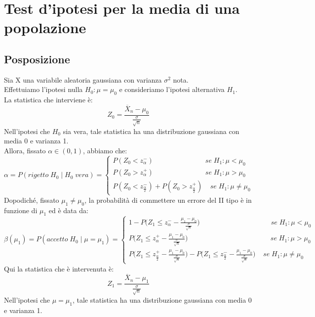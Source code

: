 \documentclass{article}
\begin{document}
\section*{Test d'ipotesi per la media di una popolazione}
\subsection*{Posposizione}
Sia X una variabile aleatoria gaussiana con varianza $\sigma^{2}$ nota.\\
Effettuiamo l'ipotesi nulla $H_{0}: \mu = \mu_{0}$ e consideriamo l'ipotesi alternativa $H_{1}$.\\
La statistica che interviene è:
\[ Z_{0} = \frac{\overline{X}_{n} - \mu_{0}}{\frac{\sigma}{\sqrt{n}}} \]
Nell'ipotesi che $H_{0}$ sia vera, tale statistica ha una distribuzione gaussiana con media 0 e varianza 1.\\
Allora, fissato $\alpha \in (0,1)$, abbiamo che:
\[ \alpha = P(rigetto \;  H_{0} \; | \; H_{0} \; vera) =
\begin{cases}
P(Z_{0} < z_{\alpha}^{-}) \; \; \; \; \; \; \; \; \; \; \; \; \; \; \; \; \; \; \; \; \; \; \; \; \; \; \; se \; H_{1}: \mu < \mu_{0}\\
P(Z_{0} > z_{\alpha}^{+}) \; \; \; \; \; \; \; \; \; \; \; \; \; \; \; \; \; \; \; \; \; \; \; \; \; \; \; se \; H_{1}: \mu > \mu_{0}\\
P(Z_{0} < z_{\frac{\alpha}{2}}^{-}) + P(Z_{0} > z_{\frac{\alpha}{2}}^{+}) \; \; \; \; se \; H_{1}: \mu \neq \mu_{0}
\end{cases}
\]
Dopodiché, fissato $\mu_{1} \neq \mu_{0}$, la probabilità di commettere un errore del II tipo è in funzione di $\mu_{1}$ ed è data da:
\[ \beta(\mu_{1}) = P(accetto \;  H_{0} \; | \; \mu = \mu_{1}) =
\begin{cases}
1 - P\Big(Z_{1} \leq z_{\alpha}^{-} - \frac{\mu_{1}-\mu_{0}}{\frac{\sigma}{\sqrt{n}}}\Big) \; \; \; \; \; \; \; \; \; \; \; \; \; \; \; \; \; \; \; \; \; \; \; \; \; \; \; \; \; \; \; \; \; \; \; \; \; se \; H_{1}: \mu < \mu_{0}\\
P\Big(Z_{1} \leq z_{\alpha}^{+} - \frac{\mu_{1}-\mu_{0}}{\frac{\sigma}{\sqrt{n}}}\Big) \; \; \; \; \; \; \; \; \; \; \; \; \; \; \; \; \; \; \; \; \; \; \; \; \; \; \; \; \; \; \; \; \; \; \; \; \; \; \; \; \; \; \; se \; H_{1}: \mu > \mu_{0}\\
P\Big(Z_{1} \leq z_{\frac{\alpha}{2}}^{+} - \frac{\mu_{1}-\mu_{0}}{\frac{\sigma}{\sqrt{n}}}\Big) - P\Big(Z_{1} \leq z_{\frac{\alpha}{2}}^{-} - \frac{\mu_{1}-\mu_{0}}{\frac{\sigma}{\sqrt{n}}}\Big) \; \; \; \; se \; H_{1}: \mu \neq \mu_{0}
\end{cases}
\]
Qui la statistica che è intervenuta è:
\[ Z_{1} = \frac{\overline{X}_{n} - \mu_{1}}{\frac{\sigma}{\sqrt{n}}} \]
Nell'ipotesi che $\mu = \mu_{1}$, tale statistica ha una distribuzione gaussiana con media 0 e varianza 1.
\end{document}
